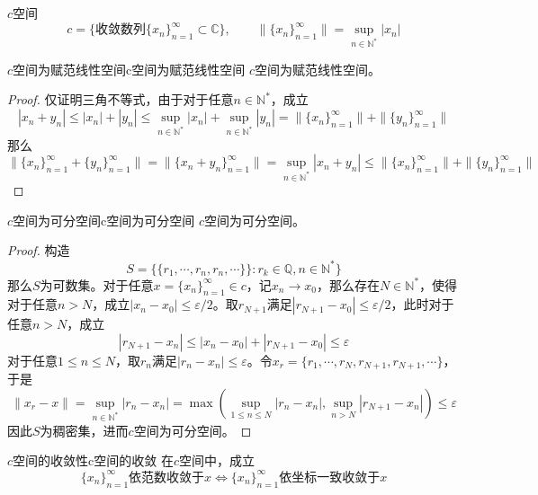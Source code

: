 \documentclass[lang = cn, scheme = chinese, thmcnt = section]{elegantbook}
\newcommand{\N}{\mathbb{N}}            %
\newcommand{\C}{\mathbb{C}}  		   %
\newcommand{\Q}{\mathbb{Q}}            %
\newcommand{\sub}{\subset}             %
\begin{document}
\begin{definition}{$c$空间}
	$$
	c=\{\text{收敛数列}\{x_n\}_{n=1}^{\infty}\sub\C\},\qquad 
	\|\{x_n\}_{n=1}^{\infty}\|=\sup_{n\in\N^*}|x_n|
	$$
\end{definition}

\begin{proposition}{$c$空间为赋范线性空间}{c空间为赋范线性空间}
	$c$空间为赋范线性空间。
\end{proposition}

\begin{proof}
	仅证明三角不等式，由于对于任意$n\in\N^*$，成立
	$$
	|x_n+y_n|\le |x_n|+|y_n|\le \sup_{n\in\N^*}|x_n|+\sup_{n\in\N^*}|y_n|=\|\{x_n\}_{n=1}^{\infty}\|+\|\{y_n\}_{n=1}^{\infty}\|
	$$
	那么
	$$
	\|\{x_n\}_{n=1}^{\infty}+\{y_n\}_{n=1}^{\infty}\|
	=\|\{x_n+y_n\}_{n=1}^{\infty}\|
	=\sup_{n\in\N^*}|x_n+y_n|
	\le \|\{x_n\}_{n=1}^{\infty}\|+\|\{y_n\}_{n=1}^{\infty}\|
	$$
\end{proof}

\begin{proposition}{$c$空间为可分空间}{c空间为可分空间}
	$c$空间为可分空间。
\end{proposition}

\begin{proof}
	构造
	$$
	S=\{ \{ r_1,\cdots,r_n,r_n,\cdots \} \}:r_k\in\Q,n\in\N^* \}
	$$
	那么$S$为可数集。对于任意$x=\{x_n\}_{n=1}^{\infty}\in c$，记$x_n\to x_0$，那么存在$N\in\N^*$，使得对于任意$n> N$，成立$|x_n-x_0|\le\varepsilon/2$。取$r_{N+1}$满足$|r_{N+1}-x_0|\le \varepsilon/2$，此时对于任意$n> N$，成立
	$$
	|r_{N+1}-x_n|\le|x_n-x_0|+|r_{N+1}-x_0|\le \varepsilon
	$$
	对于任意$1\le n \le N$，取$r_n$满足$|r_n-x_n|\le \varepsilon$。令$x_r=\{ r_1,\cdots,r_N,r_{N+1},r_{N+1},\cdots \}$，于是
	$$
	\|x_r-x\|=\sup_{n\in\N^*}|r_n-x_n|=\max\left( \sup_{1\le n \le N}|r_n-x_n|,\sup_{n>N}|r_{N+1}-x_n| \right)\le \varepsilon
	$$
	因此$S$为稠密集，进而$c$空间为可分空间。
\end{proof}

\begin{proposition}{$c$空间的收敛性}{c空间的收敛}
	在$c$空间中，成立
	$$
	\{x_n\}_{n=1}^{\infty}\text{依范数}\text{收敛于}x\iff \{x_n\}_{n=1}^{\infty}\text{依坐标一致收敛于}x
	$$
\end{proposition}
\end{document}

